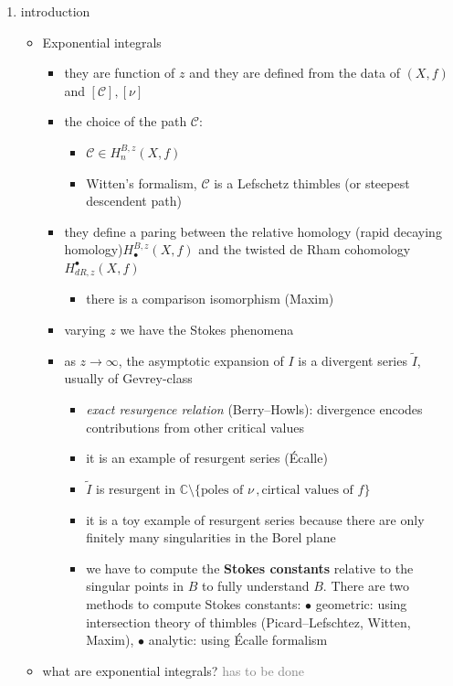 \documentclass{article}
\newcommand{\C}{\mathbb{C}}
\begin{document}
\begin{enumerate}
\item introduction
\begin{itemize}
\item Exponential integrals
\begin{itemize}
\item they are function of $z$ and they are defined from the data of $(X,f)$ and $[\mathcal{C}], [\nu]$
\item the choice of the path $\mathcal{C}$: 
\begin{itemize}
\item $\mathcal{C}\in H^{B,z}_{n}(X,f)$
\item Witten's formalism, $\mathcal{C}$ is a Lefschetz thimbles (or steepest descendent path)
\end{itemize}
\item they define a paring between the relative homology (rapid decaying homology)$H^{B,z}_{\bullet}(X,f)$ and the twisted de Rham cohomology  $H_{dR,z}^{\bullet}(X,f)$
\begin{itemize}
\item there is a comparison isomorphism (Maxim)
\end{itemize}
\item varying $z$ we have the Stokes phenomena
\item as $z\to\infty$, the asymptotic expansion of $I$ is a divergent series $\tilde{I}$, usually of Gevrey-class
\begin{itemize}
\item {\it exact resurgence relation} (Berry--Howls): divergence encodes contributions from other critical values
\item it is an example of resurgent series (\'Ecalle)
\item $\tilde{I}$ is resurgent in $\C\setminus\lbrace \text{poles of } \nu\,, \text{cirtical values of } f\rbrace$
\item it is a toy example of resurgent series because there are only finitely many singularities in the Borel plane
\item we have to compute the \textbf{Stokes constants} relative to the singular points in $B$ to fully understand $B$. There are two methods to compute Stokes constants: $\bullet$ geometric: using intersection theory of thimbles (Picard--Lefschtez, Witten, Maxim), $\bullet$ analytic: using \'Ecalle formalism   
\end{itemize} 
\end{itemize}
\item what are exponential integrals? \textcolor{gray}{has to be done}

\end{itemize}
\end{enumerate}
\end{document}
